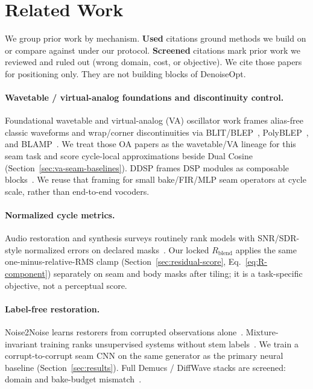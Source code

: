 \section{Related Work}
\label{sec:related_work}

We group prior work by mechanism.
\textbf{Used} citations ground methods we build on or compare against under our protocol.
\textbf{Screened} citations mark prior work we reviewed and ruled out (wrong domain, cost, or objective).
We cite those papers for positioning only.
They are not building blocks of DenoiseOpt.

\paragraph{Wavetable / virtual-analog foundations and discontinuity control.}
Foundational wavetable and virtual-analog (VA) oscillator work frames alias-free classic waveforms and wrap/corner discontinuities via BLIT/BLEP~\cite{stilson1996}, PolyBLEP~\cite{nam2009polyblep}, and BLAMP~\cite{esqueda2016blamp}.
We treat those OA papers as the wavetable/VA lineage for this seam task and score cycle-local approximations beside Dual Cosine (Section~\ref{sec:va-seam-baselines}).
DDSP frames DSP modules as composable blocks~\cite{engel2020}.
We reuse that framing for small bake/FIR/MLP seam operators at cycle scale, rather than end-to-end vocoders.

\paragraph{Normalized cycle metrics.}
Audio restoration and synthesis surveys routinely rank models with SNR/SDR-style normalized errors on declared masks~\cite{purwins2019,stoller2018}.
Our locked $R_{\mathrm{blend}}$ applies the same one-minus-relative-RMS clamp (Section~\ref{sec:residual-score}, Eq.~\eqref{eq:R-component}) separately on seam and body masks after tiling; it is a task-specific objective, not a perceptual score.

\paragraph{Label-free restoration.}
Noise2Noise learns restorers from corrupted observations alone~\cite{lehtinen2018,kashyap2021n2n}.
Mixture-invariant training ranks unsupervised systems without stem labels~\cite{wisdom2020}.
We train a corrupt-to-corrupt seam CNN on the same generator as the primary neural baseline (Section~\ref{sec:results}).
Full Demucs / DiffWave stacks are screened: domain and bake-budget mismatch~\cite{dfossez2019,kong2021}.

